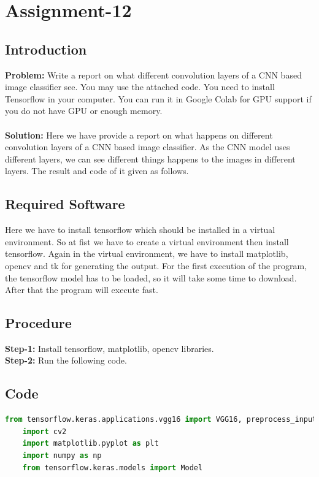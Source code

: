 \documentclass{article}
\begin{document}
{
    \section{Assignment-12}
    \subsection{Introduction}
    \textbf {Problem: }
    Write a report on what different convolution layers of a CNN based image classifier see. You may use the attached code. You need to install Tensorflow in your computer. You can run it in Google Colab for GPU support if you do not have GPU or enough memory.\\
    \\
    \textbf{Solution: }
    Here we have provide a report on what happens on different convolution layers of a CNN based image classifier. As the CNN model uses different layers, we can see different things happens to the images in different layers. The result and code of it given as follows.\\
    
    \subsection{Required Software}
    Here we have to install tensorflow which should be installed in a virtual environment. So at fist we have to create a virtual environment then install tensorflow. Again in the virtual environment, we have to install matplotlib, opencv and tk for generating the output. For the first execution of the program, the tensorflow model has to be loaded, so it will take some time to download. After that the program will execute fast.\\
    
    \subsection{Procedure}
    \textbf{Step-1:}
    Install tensorflow, matplotlib, opencv libraries.\\
    \textbf{Step-2:}
    Run the following code.\\
    
    \subsection{Code}
    \lstset{style=mystyle}
    \begin{lstlisting}[language=Python, caption=Code for using pre trained model(VGG16)]
    from tensorflow.keras.applications.vgg16 import VGG16, preprocess_input
    import cv2
    import matplotlib.pyplot as plt
    import numpy as np
    from tensorflow.keras.models import Model
    

\end{lstlisting}}
\end{document}
